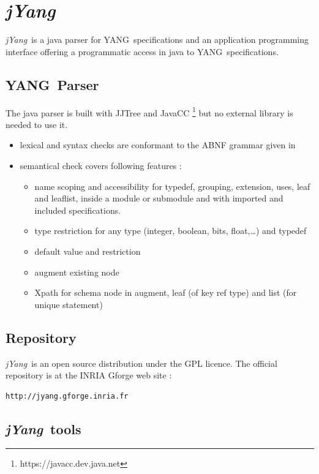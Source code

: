\documentclass[a4paper]{article}
\newcommand{\jyang}{{\sl jYang}}
\newcommand{\y}{YANG}
\begin{document}
\section{\jyang}

\jyang\ is  a java  parser for \y\  specifications and  an application
programming interface  offering a programmatic  access in java  to \y\
specifications.

\subsection{\y\ Parser}

The    java    parser    is    built   with    JJTree    and    JavaCC
\footnote{https://javacc.dev.java.net}  but  no  external  library  is
needed to use it.

\begin{itemize}
\item
lexical and syntax  checks are conformant to the  ABNF grammar given in
\cite{yang01}
\item
semantical check covers following features :
\begin{itemize}
\item
name scoping and accessibility for typedef, grouping, extension, uses,
leaf and  leaflist, inside  a module  or submodule  and with  imported and
included specifications.
\item
type restriction  for any type (integer,  boolean, bits, float,\ldots)
and typedef
\item
default value and restriction
\item
augment existing node
\item
Xpath for schema node in augment, leaf (of key ref type) and list (for
unique statement)
\end{itemize}
\end{itemize}

\subsection{Repository}

\jyang\ is an open source distribution under the GPL licence. The
official repository is at the INRIA Gforge web site :\\
\begin{verbatim}
http://jyang.gforge.inria.fr
\end{verbatim}

\subsection{\jyang\ tools}
\end{document}
